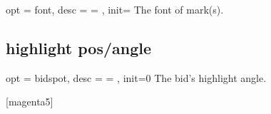 \documentclass[full]{l3doc}
\begin{document}
\begin{documentation}
\begin{option}{ opt = font, desc = {= }, init= }
  The font of mark(s).
\end{option}

\begin{SideBySideExample}[frame=single,numbers=left,%
                xrightmargin=.40\linewidth,gobble=2]
  \centering
  \begin{suanpan}
  \end{suanpan}
\end{SideBySideExample}

\subsection{highlight pos/angle}

\begin{option}{ opt = bidspot, desc = {= }, init=0 }
  The bid's highlight angle.
\end{option}

\begin{SideBySideExample}[frame=single,numbers=left,%
    xrightmargin=.45\linewidth,gobble=2]
  \centering
  \begin{suanpan}
    [magenta5]
  \end{suanpan}
\end{SideBySideExample}

\end{documentation}
\end{document}
